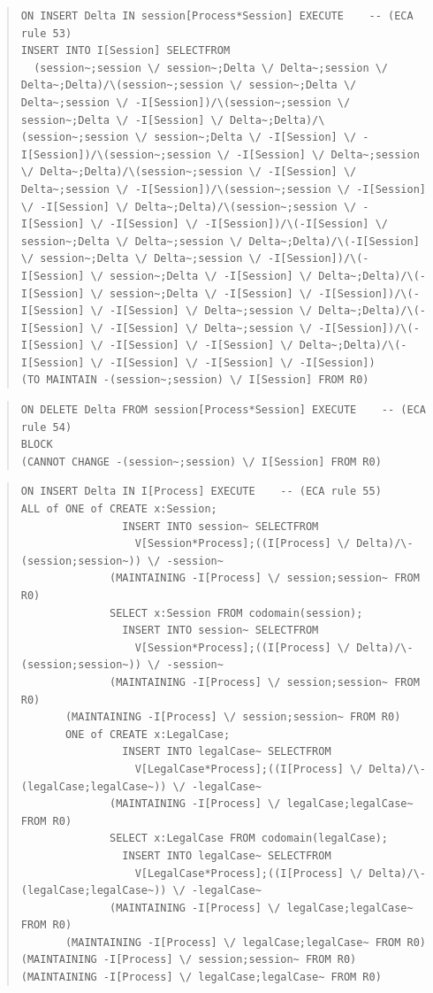 \documentclass[10pt,a4paper]{report}              %
\theoremstyle{plain}\theorembodyfont{\rmfamily}\newtheorem{definition}{Definition}[section]
\theoremstyle{plain}\theorembodyfont{\rmfamily}\newtheorem{designrule}[definition]{Requirement}
\begin{document}
\begin{quote}
\begin{verbatim}
ON INSERT Delta IN session[Process*Session] EXECUTE    -- (ECA rule 53)
INSERT INTO I[Session] SELECTFROM
  (session~;session \/ session~;Delta \/ Delta~;session \/ Delta~;Delta)/\(session~;session \/ session~;Delta \/ Delta~;session \/ -I[Session])/\(session~;session \/ session~;Delta \/ -I[Session] \/ Delta~;Delta)/\(session~;session \/ session~;Delta \/ -I[Session] \/ -I[Session])/\(session~;session \/ -I[Session] \/ Delta~;session \/ Delta~;Delta)/\(session~;session \/ -I[Session] \/ Delta~;session \/ -I[Session])/\(session~;session \/ -I[Session] \/ -I[Session] \/ Delta~;Delta)/\(session~;session \/ -I[Session] \/ -I[Session] \/ -I[Session])/\(-I[Session] \/ session~;Delta \/ Delta~;session \/ Delta~;Delta)/\(-I[Session] \/ session~;Delta \/ Delta~;session \/ -I[Session])/\(-I[Session] \/ session~;Delta \/ -I[Session] \/ Delta~;Delta)/\(-I[Session] \/ session~;Delta \/ -I[Session] \/ -I[Session])/\(-I[Session] \/ -I[Session] \/ Delta~;session \/ Delta~;Delta)/\(-I[Session] \/ -I[Session] \/ Delta~;session \/ -I[Session])/\(-I[Session] \/ -I[Session] \/ -I[Session] \/ Delta~;Delta)/\(-I[Session] \/ -I[Session] \/ -I[Session] \/ -I[Session])
(TO MAINTAIN -(session~;session) \/ I[Session] FROM R0)
\end{verbatim}
\end{quote}
\begin{quote}
\begin{verbatim}
ON DELETE Delta FROM session[Process*Session] EXECUTE    -- (ECA rule 54)
BLOCK
(CANNOT CHANGE -(session~;session) \/ I[Session] FROM R0)
\end{verbatim}
\end{quote}
\begin{quote}
\begin{verbatim}
ON INSERT Delta IN I[Process] EXECUTE    -- (ECA rule 55)
ALL of ONE of CREATE x:Session;
                INSERT INTO session~ SELECTFROM
                  V[Session*Process];((I[Process] \/ Delta)/\-(session;session~)) \/ -session~
              (MAINTAINING -I[Process] \/ session;session~ FROM R0)
              SELECT x:Session FROM codomain(session);
                INSERT INTO session~ SELECTFROM
                  V[Session*Process];((I[Process] \/ Delta)/\-(session;session~)) \/ -session~
              (MAINTAINING -I[Process] \/ session;session~ FROM R0)
       (MAINTAINING -I[Process] \/ session;session~ FROM R0)
       ONE of CREATE x:LegalCase;
                INSERT INTO legalCase~ SELECTFROM
                  V[LegalCase*Process];((I[Process] \/ Delta)/\-(legalCase;legalCase~)) \/ -legalCase~
              (MAINTAINING -I[Process] \/ legalCase;legalCase~ FROM R0)
              SELECT x:LegalCase FROM codomain(legalCase);
                INSERT INTO legalCase~ SELECTFROM
                  V[LegalCase*Process];((I[Process] \/ Delta)/\-(legalCase;legalCase~)) \/ -legalCase~
              (MAINTAINING -I[Process] \/ legalCase;legalCase~ FROM R0)
       (MAINTAINING -I[Process] \/ legalCase;legalCase~ FROM R0)
(MAINTAINING -I[Process] \/ session;session~ FROM R0)
(MAINTAINING -I[Process] \/ legalCase;legalCase~ FROM R0)
\end{verbatim}
\end{quote}
\end{document}
